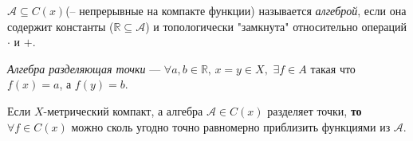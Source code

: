 
\begin{to_def}
    $\mathcal{A} \subseteq C(x)$(-- непрерывные на компакте функции) называется \textit{алгеброй}, если она содержит константы ($\mathbb{R} \subseteq \mathcal{A}$) и топологически "замкнута" относительно операций $\cdot$ и 
    $+$.
\end{to_def}

\begin{to_def}
    \textit{Алгебра разделяющая точки} --- $\forall a, b \in \mathbb{R},\, x=y \in X,\, \, \exists f \in A$ такая что $f(x)=a$, а $f(y) = b$.
\end{to_def}

\begin{to_thr}
    Если $X$-метрический компакт, а алгебра $\mathcal{A}\in C(x)$ разделяет точки, \textbf{то} $\forall f \in C(x)$ можно сколь угодно точно равномерно приблизить функциями из $\mathcal{A}$.
\end{to_thr}